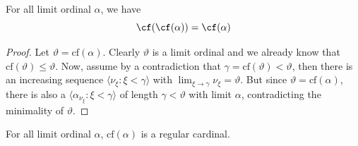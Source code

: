\begin{lemma}{}{}
    For all limit ordinal $\alpha$, we have
    $$\cf(\cf(\alpha))=\cf(\alpha)$$
\end{lemma}

\begin{proof}
    Let $\vartheta=\text{cf}(\alpha)$. Clearly $\vartheta$ is a limit ordinal and we already know that $\text{cf}(\vartheta)\leq\vartheta$. Now, assume by a contradiction that $\gamma=\text{cf}(\vartheta)<\vartheta$, then there is an increasing sequence $\langle\nu_\xi:\xi<\gamma\rangle$ with $\lim_{\xi\to\gamma}\nu_\xi=\vartheta$. But since $\vartheta=\text{cf}(\alpha)$, there is also a $\langle\alpha_{\nu_\xi}:\xi<\gamma\rangle$ of length $\gamma<\vartheta$ with limit $\alpha$, contradicting the minimality of $\vartheta$.
\end{proof}

\begin{corollary}{}{}
    For all limit ordinal $\alpha$, $\text{cf}(\alpha)$ is a regular cardinal.
\end{corollary}